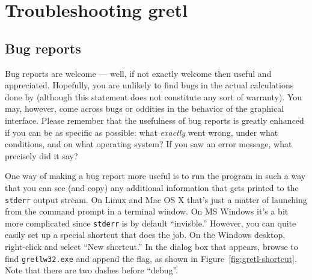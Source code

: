 \chapter{Troubleshooting gretl}
\label{trouble}

\section{Bug reports}
\label{trouble-bugs}

Bug reports are welcome --- well, if not exactly welcome then useful
and appreciated. Hopefully, you are unlikely to find bugs in the
actual calculations done by  (although this statement does
not constitute any sort of warranty). You may, however, come across
bugs or oddities in the behavior of the graphical interface.  Please
remember that the usefulness of bug reports is greatly enhanced if you
can be as specific as possible: what \emph{exactly} went wrong, under
what conditions, and on what operating system?  If you saw an error
message, what precisely did it say?

One way of making a bug report more useful is to run the program in
such a way that you can see (and copy) any additional information that
gets printed to the \texttt{stderr} output stream. On Linux and Mac
OS X that's just a matter of launching  from the command
prompt in a terminal window. On MS Windows it's a bit more complicated
since \texttt{stderr} is by default ``invisble.'' However, you can
quite easily set up a special  shortcut that does the job.
On the Windows desktop, right-click and select ``New shortcut.'' In the
dialog box that appears, browse to find \texttt{gretlw32.exe} and
append the  flag, as shown in
Figure~\ref{fig:gretl-shortcut}.  Note that there are two dashes
before ``debug''.

